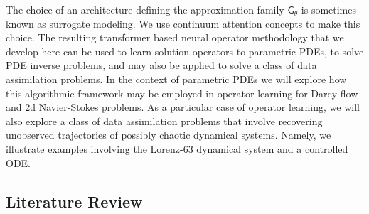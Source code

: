 \documentclass[twoside]{article}
\newcommand{\1}{\mathbbm{1}}
\newcommand{\cN}{\mathcal{N}}
\newcommand{\sG}{\mathsf{G}}
\newcommand{\ec}[1]{{\color{blue}{#1}}}
\newcommand{\ml}[1]{{\color{cyan}{#1}}}
\begin{document}
The choice of an architecture defining the approximation family $\sG_\theta$ is sometimes
known as surrogate modeling. We use continuum attention concepts to make this choice.
The resulting transformer based neural operator methodology that we develop here can be used to learn solution operators to parametric PDEs, to solve PDE inverse problems, and may also be applied to solve a class of data assimilation problems. In the context of parametric PDEs we will explore how this algorithmic framework may be employed
in operator learning for Darcy flow and 2d Navier-Stokes problems. As a particular case of operator learning, we will also explore a class of data assimilation problems that involve recovering unobserved trajectories of possibly chaotic dynamical systems. Namely, we illustrate examples involving the Lorenz-63 dynamical system and a controlled ODE.




\subsection{Literature Review}
\end{document}

